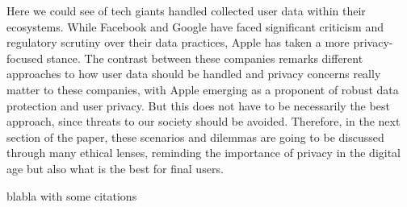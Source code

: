 Here we could see of tech giants handled collected user data within their ecosystems.
While Facebook and Google have faced significant criticism and regulatory scrutiny over their data practices, Apple has taken a more privacy-focused stance.
The contrast between these companies remarks different approaches to how user data should be handled and privacy concerns really matter to these companies, with Apple emerging as a proponent of robust data protection and user privacy.
But this does not have to be necessarily the best approach, since threats to our society should be avoided.
Therefore, in the next section of the paper, these scenarios and dilemmas are going to be discussed through many ethical lenses, reminding the importance of privacy in the digital age but also what is the best for final users.

\noindent blabla with some citations \cite{Pulay1980_Mixing, Lindner2015_MNQN}

